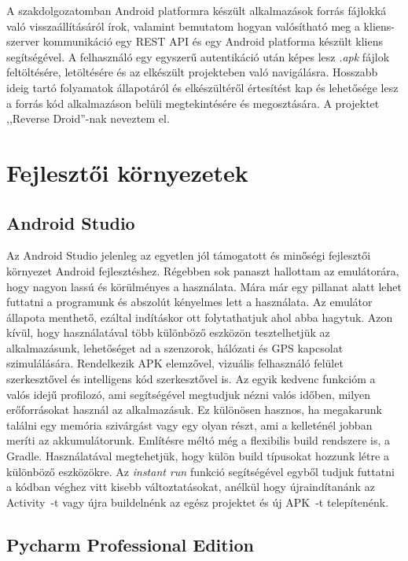 \documentclass{thesis-ekf}
\theoremstyle{definition}
\theoremstyle{remark}
\begin{document}
A szakdolgozatomban Android platformra készült alkalmazások forrás fájlokká való visszaállításáról írok, valamint bemutatom hogyan valósítható meg a kliens-szerver kommunikáció egy REST API és egy Android platforma készült kliens segítségével.
A felhasználó egy egyszerű autentikáció után képes lesz \emph{.apk} fájlok feltöltésére, letöltésére és az elkészült projekteben való navigálásra.
Hosszabb ideig tartó folyamatok állapotáról és elkészültéről értesítést kap és lehetősége lesz a forrás kód alkalmazáson belüli megtekintésére és megosztására.
A projektet ,,Reverse Droid''-nak neveztem el.

\chapter{Fejlesztői környezetek}\label{kornyezetek}

\section{Android Studio}

Az Android Studio jelenleg az egyetlen jól támogatott és minőségi fejlesztői környezet Android fejlesztéshez.
Régebben sok panaszt hallottam az emulátorára, hogy nagyon lassú és körülményes a használata.
Mára már egy pillanat alatt lehet futtatni a programunk és abszolút kényelmes lett a használata.
Az emulátor állapota menthető, ezáltal indításkor ott folytathatjuk ahol abba hagytuk. Azon kívül, hogy használatával több különböző eszközön tesztelhetjük az alkalmazásunk, lehetőséget ad a szenzorok, hálózati és GPS kapcsolat szimulálására. 
Rendelkezik APK elemzővel, vizuális felhasználó felület szerkesztővel és intelligens kód szerkesztővel is.
Az egyik kedvenc funkcióm a valós idejű profilozó, ami segítségével megtudjuk nézni valós időben, milyen erőforrásokat használ az alkalmazásuk.
Ez különösen hasznos, ha megakarunk találni egy memória szivárgást vagy egy olyan részt, ami a kelleténél jobban meríti az akkumulátorunk.
Említésre méltó még a flexibilis build rendszere is, a Gradle. Használatával megtehetjük, hogy külön build típusokat hozzunk létre a különböző eszközökre.
Az \emph{instant run} funkció segítségével egyből tudjuk futtatni a kódban véghez vitt kisebb változtatásokat, anélkül hogy újraindítanánk az Activity~-t vagy újra buildelnénk az egész projektet és új APK~-t telepítenénk.
\cite{androidstudio}


\section{Pycharm Professional Edition}
\end{document}
